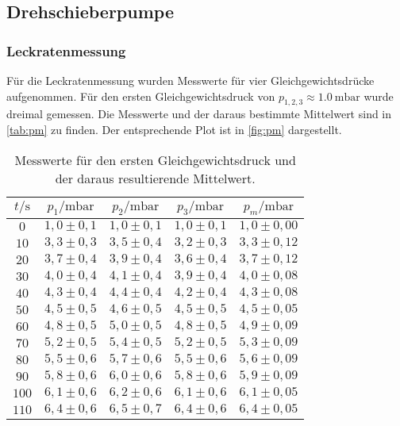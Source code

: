 \subsection{Drehschieberpumpe}
\subsubsection{Leckratenmessung}
Für die Leckratenmessung wurden Messwerte für vier Gleichgewichtsdrücke aufgenommen. Für den ersten
Gleichgewichtsdruck von $p_{1, 2, 3} \approx \SI{1,0}{\milli\bar}$ wurde dreimal gemessen.
Die Messwerte und der daraus bestimmte Mittelwert sind in \autoref{tab:pm} zu finden. Der entsprechende Plot
ist in \autoref{fig:pm} dargestellt.

\begin{table}[H]
  \centering
  \caption{Messwerte für den ersten Gleichgewichtsdruck und der daraus resultierende Mittelwert.}
  \label{tab:pm}
  \begin{tabular}{c c c c c}
    \toprule
  $t/\si{\second}$ & $p_1 /\si{\milli\bar}$ & $p_2 /\si{\milli\bar}$ & $p_3 /\si{\milli\bar}$ & $p_m /\si{\milli\bar}$ \\
    \midrule
    $  0$ & $ 1,0 \pm 0,1 $ & $ 1,0 \pm 0,1 $ & $ 1,0 \pm 0,1 $& $ 1,0 \pm 0,00 $ \\ 
    $ 10$ & $ 3,3 \pm 0,3 $ & $ 3,5 \pm 0,4 $ & $ 3,2 \pm 0,3 $& $ 3,3 \pm 0,12 $ \\ 
    $ 20$ & $ 3,7 \pm 0,4 $ & $ 3,9 \pm 0,4 $ & $ 3,6 \pm 0,4 $& $ 3,7 \pm 0,12 $ \\ 
    $ 30$ & $ 4,0 \pm 0,4 $ & $ 4,1 \pm 0,4 $ & $ 3,9 \pm 0,4 $& $ 4,0 \pm 0,08 $ \\ 
    $ 40$ & $ 4,3 \pm 0,4 $ & $ 4,4 \pm 0,4 $ & $ 4,2 \pm 0,4 $& $ 4,3 \pm 0,08 $ \\ 
    $ 50$ & $ 4,5 \pm 0,5 $ & $ 4,6 \pm 0,5 $ & $ 4,5 \pm 0,5 $& $ 4,5 \pm 0,05 $ \\ 
    $ 60$ & $ 4,8 \pm 0,5 $ & $ 5,0 \pm 0,5 $ & $ 4,8 \pm 0,5 $& $ 4,9 \pm 0,09 $ \\ 
    $ 70$ & $ 5,2 \pm 0,5 $ & $ 5,4 \pm 0,5 $ & $ 5,2 \pm 0,5 $& $ 5,3 \pm 0,09 $ \\ 
    $ 80$ & $ 5,5 \pm 0,6 $ & $ 5,7 \pm 0,6 $ & $ 5,5 \pm 0,6 $& $ 5,6 \pm 0,09 $ \\ 
    $ 90$ & $ 5,8 \pm 0,6 $ & $ 6,0 \pm 0,6 $ & $ 5,8 \pm 0,6 $& $ 5,9 \pm 0,09 $ \\ 
    $100$ & $ 6,1 \pm 0,6 $ & $ 6,2 \pm 0,6 $ & $ 6,1 \pm 0,6 $& $ 6,1 \pm 0,05 $ \\ 
    $110$ & $ 6,4 \pm 0,6 $ & $ 6,5 \pm 0,7 $ & $ 6,4 \pm 0,6 $& $ 6,4 \pm 0,05 $ \\ 

\end{tabular}
\end{table}
